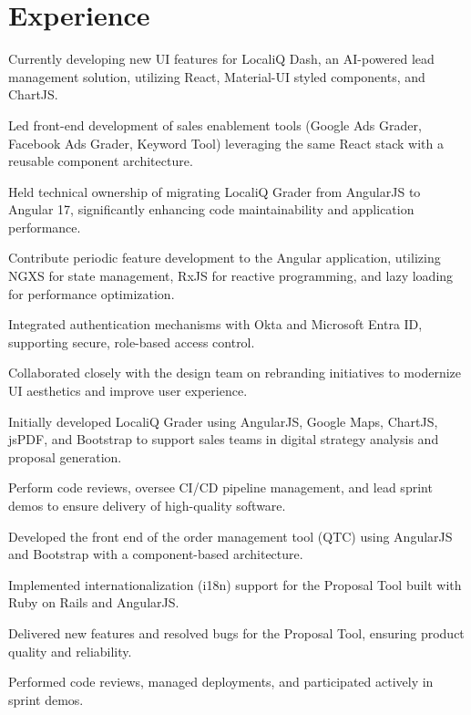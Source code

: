 \documentclass[]{my-resume-openfont}
\begin{document}
\hfill
\begin{minipage}[t]{0.66\textwidth}


\section{Experience}

\vspace{\topsep} %
\begin{tightemize}
\item{Currently developing new UI features for LocaliQ Dash, an AI-powered lead management solution, utilizing React, Material-UI styled components, and ChartJS.}
\item{Led front-end development of sales enablement tools (Google Ads Grader, Facebook Ads Grader, Keyword Tool) leveraging the same React stack with a reusable component architecture.}
\item{Held technical ownership of migrating LocaliQ Grader from AngularJS to Angular 17, significantly enhancing code maintainability and application performance.}
\item{Contribute periodic feature development to the Angular application, utilizing NGXS for state management, RxJS for reactive programming, and lazy loading for performance optimization.}
\item{Integrated authentication mechanisms with Okta and Microsoft Entra ID, supporting secure, role-based access control.}
\item{Collaborated closely with the design team on rebranding initiatives to modernize UI aesthetics and improve user experience.}
\item{Initially developed LocaliQ Grader using AngularJS, Google Maps, ChartJS, jsPDF, and Bootstrap to support sales teams in digital strategy analysis and proposal generation.}
\item{Perform code reviews, oversee CI/CD pipeline management, and lead sprint demos to ensure delivery of high-quality software.}
\end{tightemize}
\sectionsep

\begin{tightemize}
\item{Developed the front end of the order management tool (QTC) using AngularJS and Bootstrap with a component-based architecture.}
\item{Implemented internationalization (i18n) support for the Proposal Tool built with Ruby on Rails and AngularJS.}
\item{Delivered new features and resolved bugs for the Proposal Tool, ensuring product quality and reliability.}
\item{Performed code reviews, managed deployments, and participated actively in sprint demos.}
\end{tightemize}
\sectionsep


\end{minipage}
\end{document}
